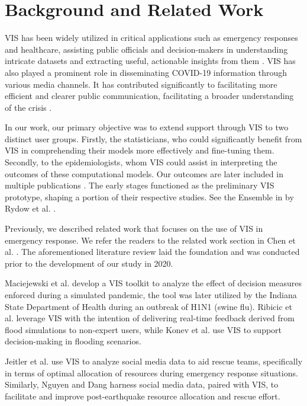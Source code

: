 \section{Background and Related Work}

\ac{VIS} has been widely utilized in critical applications such as emergency responses and healthcare, assisting public officials and decision-makers in understanding intricate datasets and extracting useful, actionable insights from them \cite{dusse2016Information}. 
\ac{VIS} has also played a prominent role in disseminating COVID-19 information through various media channels. It has contributed significantly to facilitating more efficient and clearer public communication, facilitating a broader understanding of the crisis \cite{johnshopkinsuniversityCOVID19}.

In our work, our primary objective was to extend support through \ac{VIS} to two distinct user groups.
Firstly, the statisticians, who could significantly benefit from VIS in comprehending their models more effectively and fine-tuning them.
Secondly, to the epidemiologists, whom VIS could assist in interpreting the outcomes of these computational models. Our outcomes are later included in multiple publications \cite{chen2022RAMPVIS,dykes2022Visualizationb,khan2022Propagating,khan2022Rapid,rydow2023RAMPVIS}. The early stages functioned as the preliminary VIS prototype, shaping a portion of their respective studies. See the Ensemble in  by Rydow et al. \cite{rydow2023RAMPVIS}.


Previously, we described related work that focuses on the use of \ac{VIS} in emergency response. We refer the readers to the related work section in Chen et al. \cite{chen2022RAMPVIS}. The aforementioned literature review laid the foundation and was conducted prior to the development of our study in 2020.

Maciejewski et al. \cite{maciejewski2011Pandemica} develop a VIS toolkit to analyze the effect of decision measures enforced during a simulated pandemic, the tool was later utilized by the Indiana State Department of Health during an outbreak of H1N1 (swine flu).
Ribicic et al. \cite{ribicic2012Sketching} leverage VIS with the intention of delivering real-time feedback derived from flood simulations to non-expert users, while Konev et al. \cite{konev2014Run} use VIS to support decision-making in flooding scenarios.

Jeitler et al. \cite{jeitler2019RescueMark} use VIS to analyze social media data to aid rescue teams, specifically in terms of optimal allocation of resources during emergency response situations.
Similarly, Nguyen and Dang \cite{nguyen2019EQSA} harness social media data, paired with VIS, to facilitate and improve post-earthquake resource allocation and rescue effort.

